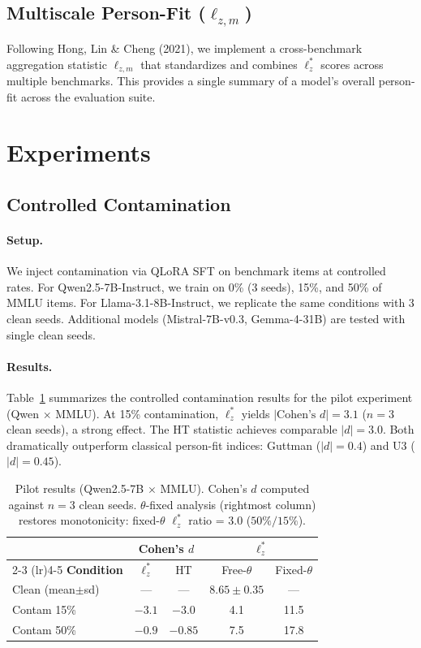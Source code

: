 \documentclass[11pt,a4paper]{article}
\begin{document}
\subsection{Multiscale Person-Fit ($\ell_{z,m}$)}

Following Hong, Lin \& Cheng (2021), we implement a cross-benchmark aggregation statistic $\ell_{z,m}$ that standardizes and combines $\ell_z^*$ scores across multiple benchmarks. This provides a single summary of a model's overall person-fit across the evaluation suite.

\section{Experiments}

\subsection{Controlled Contamination}\label{sec:ctrl_contam}

\paragraph{Setup.} We inject contamination via QLoRA SFT on benchmark items at controlled rates. For Qwen2.5-7B-Instruct, we train on 0\% (3 seeds), 15\%, and 50\% of MMLU items. For Llama-3.1-8B-Instruct, we replicate the same conditions with 3 clean seeds. Additional models (Mistral-7B-v0.3, Gemma-4-31B) are tested with single clean seeds.

\paragraph{Results.}

Table~\ref{tab:pilot} summarizes the controlled contamination results for the pilot experiment (Qwen $\times$ MMLU). At 15\% contamination, $\ell_z^*$ yields $|\text{Cohen's } d| = 3.1$ ($n=3$ clean seeds), a strong effect. The HT statistic achieves comparable $|d| = 3.0$. Both dramatically outperform classical person-fit indices: Guttman ($|d| = 0.4$) and U3 ($|d| = 0.45$).

\begin{table}[t]
\centering
\small
\begin{tabular}{lcccc}
\toprule
 & \multicolumn{2}{c}{\textbf{Cohen's $d$}} & \multicolumn{2}{c}{\textbf{$\ell_z^*$}} \\
\cmidrule(lr){2-3} \cmidrule(lr){4-5}
\textbf{Condition} & $\ell_z^*$ & HT & Free-$\theta$ & Fixed-$\theta$ \\
\midrule
Clean (mean$\pm$sd) & --- & --- & $8.65 \pm 0.35$ & --- \\
Contam 15\% & $-3.1$ & $-3.0$ & 4.1 & 11.5 \\
Contam 50\% & $-0.9$ & $-0.85$ & 7.5 & 17.8 \\
\bottomrule
\end{tabular}
\caption{Pilot results (Qwen2.5-7B $\times$ MMLU). Cohen's $d$ computed against $n=3$ clean seeds. $\theta$-fixed analysis (rightmost column) restores monotonicity: fixed-$\theta$ $\ell_z^*$ ratio = 3.0 ($50\%/15\%$).}
\label{tab:pilot}
\end{table}
\end{document}
